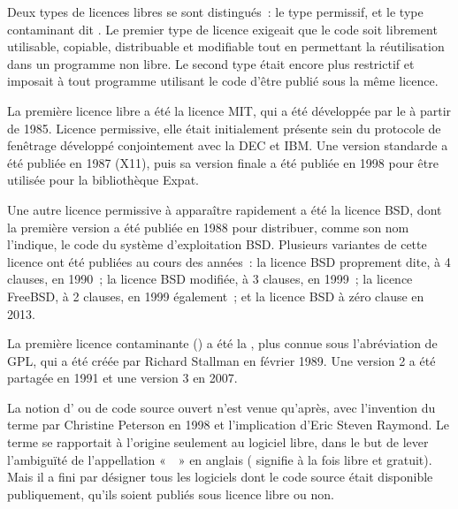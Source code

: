 Deux types de licences libres se sont distingués~: le type permissif, et le type contaminant dit . Le premier type de licence exigeait que le code soit librement utilisable, copiable, distribuable et modifiable tout en permettant la réutilisation dans un programme non libre. Le second type était encore plus restrictif et imposait à tout programme utilisant le code d'être publié sous la même licence.

La première licence libre a été la licence MIT, qui a été développée par le  à partir de 1985. Licence permissive, elle était initialement présente sein du protocole de fenêtrage  développé conjointement avec la DEC et IBM. Une version standarde a été publiée en 1987 (X11), puis sa version finale a été publiée en 1998 pour être utilisée pour la bibliothèque Expat.

Une autre licence permissive à apparaître rapidement a été la licence BSD, dont la première version a été publiée en 1988 pour distribuer, comme son nom l'indique, le code du système d'exploitation BSD. Plusieurs variantes de cette licence ont été publiées au cours des années~: la licence BSD proprement dite, à 4 clauses, en 1990~; la licence BSD modifiée, à 3 clauses, en 1999~; la licence FreeBSD, à 2 clauses, en 1999 également~; et la licence BSD à zéro clause en 2013.

La première licence contaminante () a été la , plus connue sous l'abréviation de GPL, qui a été créée par Richard Stallman en février 1989. Une version 2 a été partagée en 1991 et une version 3 en 2007.

La notion d' ou de code source ouvert n'est venue qu'après, avec l'invention du terme par Christine Peterson en 1998 et l'implication d'Eric Steven Raymond. Le terme se rapportait à l'origine seulement au logiciel libre, dans le but de lever l'ambiguïté de l'appellation «~~» en anglais ( signifie à la fois libre et gratuit). Mais il a fini par désigner tous les logiciels dont le code source était disponible publiquement, qu'ils soient publiés sous licence libre ou non.

